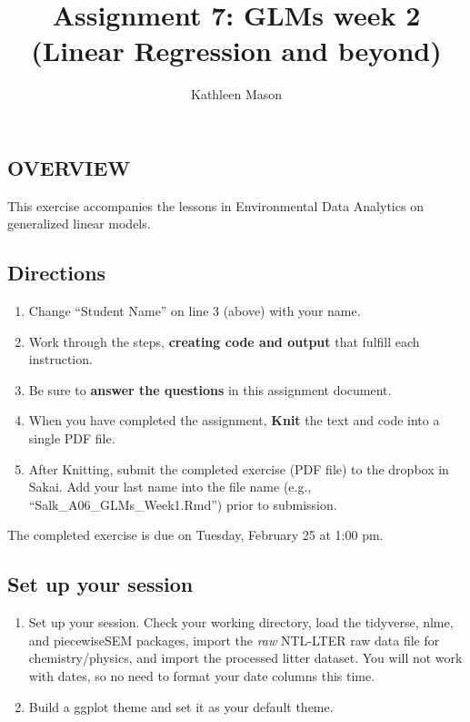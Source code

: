 \documentclass[]{article}
\title{Assignment 7: GLMs week 2 (Linear Regression and beyond)}
\author{Kathleen Mason}
\date{}
\providecommand{\tightlist}{%
  \setlength{\itemsep}{0pt}\setlength{\parskip}{0pt}}
\begin{document}
\maketitle

\hypertarget{overview}{%
\subsection{OVERVIEW}\label{overview}}

This exercise accompanies the lessons in Environmental Data Analytics on
generalized linear models.

\hypertarget{directions}{%
\subsection{Directions}\label{directions}}

\begin{enumerate}
\def\labelenumi{\arabic{enumi}.}
\tightlist
\item
  Change ``Student Name'' on line 3 (above) with your name.
\item
  Work through the steps, \textbf{creating code and output} that fulfill
  each instruction.
\item
  Be sure to \textbf{answer the questions} in this assignment document.
\item
  When you have completed the assignment, \textbf{Knit} the text and
  code into a single PDF file.
\item
  After Knitting, submit the completed exercise (PDF file) to the
  dropbox in Sakai. Add your last name into the file name (e.g.,
  ``Salk\_A06\_GLMs\_Week1.Rmd'') prior to submission.
\end{enumerate}

The completed exercise is due on Tuesday, February 25 at 1:00 pm.

\hypertarget{set-up-your-session}{%
\subsection{Set up your session}\label{set-up-your-session}}

\begin{enumerate}
\def\labelenumi{\arabic{enumi}.}
\item
  Set up your session. Check your working directory, load the tidyverse,
  nlme, and piecewiseSEM packages, import the \emph{raw} NTL-LTER raw
  data file for chemistry/physics, and import the processed litter
  dataset. You will not work with dates, so no need to format your date
  columns this time.
\item
  Build a ggplot theme and set it as your default theme.
\end{enumerate}
\end{document}
